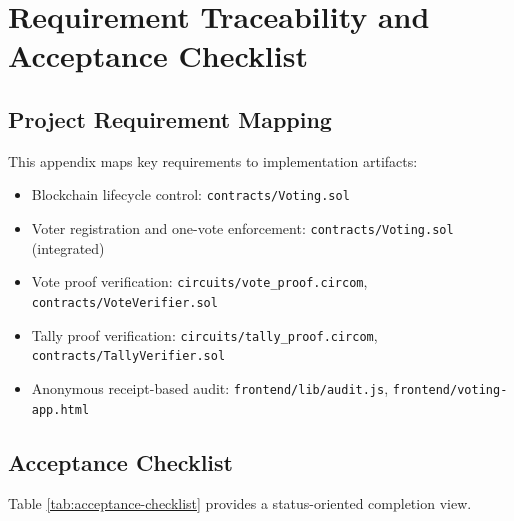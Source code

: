 \chapter{Requirement Traceability and Acceptance Checklist}
\label{app:traceability}
\begingroup
\justifying
\setlength{\parindent}{0pt}
\setlength{\parskip}{0.5\baselineskip}
\titlespacing{\chapter}{0pt}{0pt}{0pt}
\titlespacing{\section}{0pt}{0pt}{0pt}

\section{Project Requirement Mapping}
This appendix maps key requirements to implementation artifacts:
\begin{itemize}
    \item Blockchain lifecycle control: \texttt{contracts/Voting.sol}
    \item Voter registration and one-vote enforcement: \texttt{contracts/Voting.sol} (integrated)
    \item Vote proof verification: \texttt{circuits/vote\_proof.circom}, \texttt{contracts/VoteVerifier.sol}
    \item Tally proof verification: \texttt{circuits/tally\_proof.circom}, \texttt{contracts/TallyVerifier.sol}
    \item Anonymous receipt-based audit: \texttt{frontend/lib/audit.js}, \texttt{frontend/voting-app.html}
\end{itemize}

\section{Acceptance Checklist}
Table \ref{tab:acceptance-checklist} provides a status-oriented completion view.

